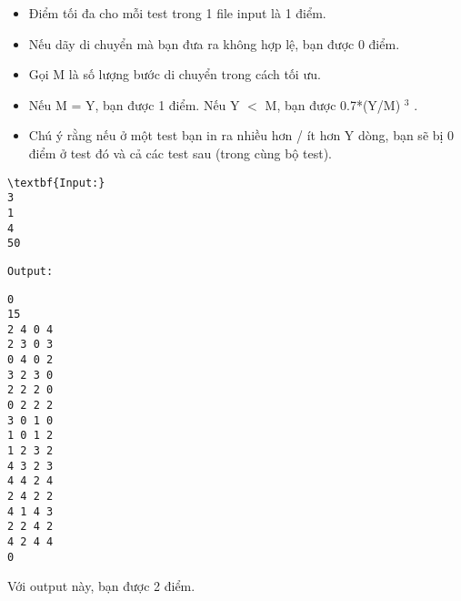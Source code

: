 \begin{itemize}
	\item     Điểm tối đa cho mỗi test trong 1 file input là 1 điểm.   
	\item     Nếu dãy di chuyển mà bạn đưa ra không hợp lệ, bạn được 0 điểm.   
	\item     Gọi M là số lượng bước di chuyển trong cách tối ưu.   
	\item     Nếu M = Y, bạn được 1 điểm. Nếu Y $<$ M, bạn được 0.7*(Y/M)    $^     3    $    .   
	\item     Chú ý rằng nếu ở một test bạn in ra nhiều hơn / ít hơn Y dòng, bạn sẽ bị 0 điểm ở test đó và cả các test sau (trong cùng bộ test).   
\end{itemize}
\begin{verbatim}
\textbf{Input:}
3
1
4
50
\end{verbatim}
\begin{verbatim}
Output:\end{verbatim}
\begin{verbatim}
0
15
2 4 0 4
2 3 0 3
0 4 0 2
3 2 3 0
2 2 2 0
0 2 2 2
3 0 1 0
1 0 1 2
1 2 3 2
4 3 2 3
4 4 2 4
2 4 2 2
4 1 4 3
2 2 4 2
4 2 4 4
0
\end{verbatim}

   Với output này, bạn được 2 điểm.